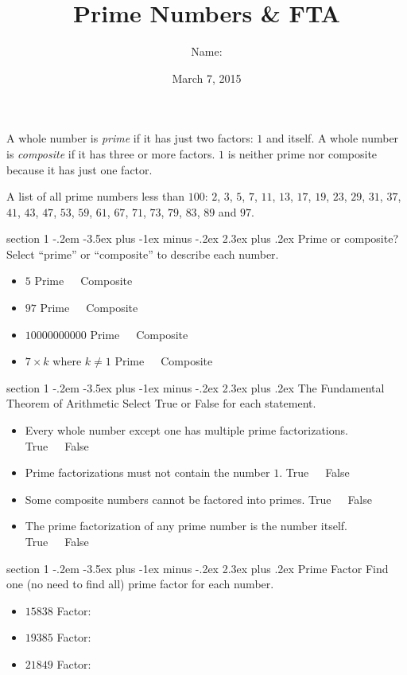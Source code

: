 \documentclass[12pt,letterpaper]{article}
\title{Prime Numbers \& FTA}
\author{Name: \underline{\hspace{5cm}}}
\date{March 7, 2015}
\makeatletter
\newenvironment{problem}{\@startsection
       {section}
       {1}
       {-.2em}
       {-3.5ex plus -1ex minus -.2ex}
       {2.3ex plus .2ex}
       {\pagebreak[3]
       \large\bf\noindent{Problem }
       }
       }
\makeatother
\begin{document}
\maketitle

\thispagestyle{empty}

A whole number is \emph{prime} if it has just two factors: $1$ and itself.
A whole number is \emph{composite} if it has three or more factors.
$1$ is neither prime nor composite because it has just one factor.

A list of all prime numbers less than $100$: $2$, $3$,
$5$, $7$, $11$, $13$, $17$, $19$, $23$, $29$, $31$,
$37$, $41$, $43$, $47$, $53$, $59$, $61$, $67$,
$71$, $73$, $79$, $83$, $89$ and $97$.

\begin{problem}{Prime or composite?}
Select ``prime'' or ``composite'' to describe each number.

\begin{itemize}
 \item $5$ \hfill Prime~~~Composite
 \item $97$ \hfill Prime~~~Composite
 \item $10000000000$ \hfill Prime~~~Composite
 \item $7\times k$ where $k\ne1$ \hfill Prime~~~Composite
\end{itemize}
\end{problem}

\begin{problem}{The Fundamental Theorem of Arithmetic}
 Select True or False for each statement.
 
 \begin{itemize}
  \item Every whole number except one has multiple prime factorizations. \hfill True~~~False
  \item Prime factorizations must not contain the number $1$. \hfill True~~~False
  \item Some composite numbers cannot be factored into primes. \hfill True~~~False
  \item The prime factorization of any prime number is the number itself. \hfill True~~~False
 \end{itemize}

\end{problem}


\begin{problem}{Prime Factor}
 Find one (no need to find all) prime factor for each number.
 
 \begin{itemize}
  \item $15838$ \hfill Factor: \underline{\hspace{2em}}
  \item $19385$ \hfill Factor: \underline{\hspace{2em}}
  \item $21849$ \hfill Factor: \underline{\hspace{2em}}
 \end{itemize}

\end{problem}
\end{document}
